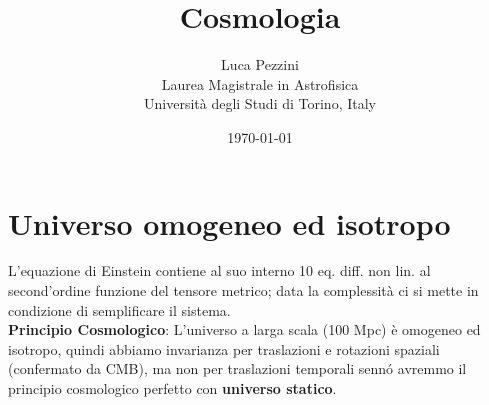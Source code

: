 \documentclass[12pt, a4paper]{article}
\begin{document}
\title{Cosmologia}
\author{Luca Pezzini \\ Laurea Magistrale in Astrofisica \\ Universit\`{a} degli Studi di Torino, Italy}
\date{\today}

\maketitle
\newpage
\tableofcontents
\newpage
\section{Universo omogeneo ed isotropo}
L'equazione di Einstein contiene al suo interno 10 eq. diff. non lin. al second'ordine funzione del tensore metrico; data la complessità ci si mette in condizione di semplificare il sistema.\\ 
\textbf{Principio Cosmologico}: L'universo a larga scala (100 Mpc) è omogeneo ed isotropo, quindi abbiamo invarianza per traslazioni e  rotazioni spaziali (confermato da CMB), ma non per traslazioni temporali senn\'{o} avremmo il principio cosmologico perfetto con \textbf{universo  statico}.
\end{document}
